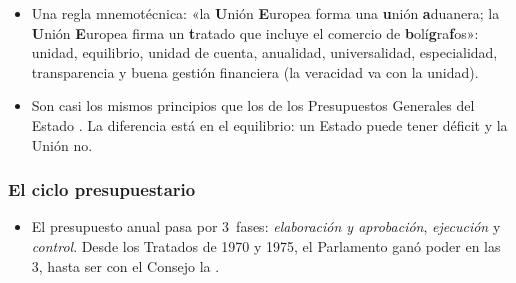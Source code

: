 \documentclass[11pt]{article}
\begin{document}
\begin{itemize}
\begin{itemize}
\begin{itemize}
    \end{itemize}
  \item \emph{Que se gaste bien y a la vista}:
    \begin{itemize}
    \item {}: economía, eficiencia y eficacia, con objetivos e indicadores por programa;
    \item {}: el presupuesto se publica en el \emph{Diario Oficial}, y los beneficiarios de los fondos, en un sistema de consulta (FTS).
    \end{itemize}
  \end{itemize}
\item Una regla mnemotécnica: «la \textbf{U}nión \textbf{E}uropea forma una \textbf{u}nión \textbf{a}duanera; la \textbf{U}nión \textbf{E}uropea firma un \textbf{t}ratado que incluye el comercio de \textbf{b}olí\textbf{g}ra\textbf{f}os»: unidad, equilibrio, unidad de cuenta, anualidad, universalidad, especialidad, transparencia y buena gestión financiera (la veracidad va con la unidad).
\item Son casi los mismos principios que los de los Presupuestos Generales del Estado . La diferencia está en el equilibrio: un Estado puede tener déficit y la Unión no.
\end{itemize}

\subsubsection{El ciclo presupuestario}\label{sec:ciclo}

\begin{itemize}
\item El presupuesto anual pasa por 3~fases: \emph{elaboración y aprobación}, \emph{ejecución} y \emph{control}. Desde los Tratados de 1970 y 1975, el Parlamento ganó poder en las 3, hasta ser con el Consejo la .
\end{itemize}

\begin{infografia}[p]
\centering
\caption{El ciclo presupuestario anual: el calendario pragmático y los pasos del art. 314~TFUE}\label{figu:procedimiento}
\end{infografia}
\end{document}
